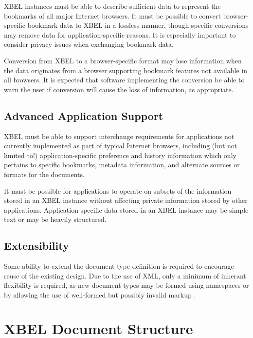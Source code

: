 \documentclass{howto}
\begin{document}
    XBEL instances must be able to describe sufficient data to
    represent the bookmarks of all major Internet browsers.
    It must be possible to convert browser-specific bookmark data to
    XBEL in a lossless manner, though specific conversions may remove
    data for application-specific reasons.  It is especially important
    to consider privacy issues when exchanging bookmark data.

    Conversion from XBEL to a browser-specific format may lose
    information when the data originates from a browser supporting
    bookmark features not available in all browsers.  It is expected
    that software implementing the conversion be able to warn the user
    if conversion will cause the loss of information, as appropriate.

  \subsection{Advanced Application Support
              \label{req-applications}}

    XBEL must be able to support interchange requirements for
    applications not currently implemented as part of typical Internet
    browsers, including (but not limited to!) application-specific
    preference and history information which only pertains to specific
    bookmarks, metadata information, and alternate sources or formats
    for the documents.

    It must be possible for applications to operate on subsets of the
    information stored in an XBEL instance without affecting private
    information stored by other applications.  Application-specific
    data stored in an XBEL instance may be simple text or may be
    heavily structured.

  \subsection{Extensibility
              \label{req-extensibility}}

    Some ability to extend the document type definition is required to 
    encourage reuse of the existing design.  Due to the use of XML,
    only a minimum of inherant flexibility is required, as new
    document types may be formed using namespaces or by allowing the
    use of well-formed but possibly invalid markup \cite{w3c-xml-names}.


\section{XBEL Document Structure
         \label{document-structure}}
\end{document}
